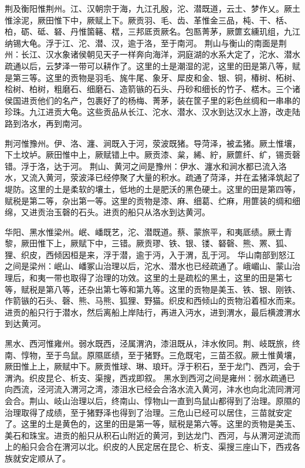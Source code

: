 \documentclass[a4paper,12pt,UTF8,twoside]{ctexbook}
\begin{document}
荆及衡阳惟荆州。江、汉朝宗于海，九江孔殷，沱、潜既道，云土、梦作乂。厥土惟涂泥，厥田惟下中，厥赋上下。厥贡羽、毛、齿、革惟金三品，杶、干、栝、柏，砺、砥、砮、丹惟箘簵、楛，三邦厎贡厥名。包匦菁茅，厥篚玄纁玑组，九江纳锡大龟。浮于江、沱、潜、汉，逾于洛，至于南河。
荆山与衡山的南面是荆州：长江、汉水象诸侯朝见天子一样奔向海洋，洞庭湖的水系大定了，沱水、潜水疏通以后，云梦泽一带可以耕作了。这里的土是潮湿的泥，这里的田是第八等，赋是第三等。这里的贡物是羽毛、旄牛尾、象牙、犀皮和金、银、铜，椿树、柘树、桧树、柏树，粗磨石、细磨石、造箭镞的石头、丹砂和细长的竹子、楛木。三个诸侯国进贡他们的名产，包裹好了的杨梅、菁茅，装在筐子里的彩色丝绸和一串串的珍珠。九江进贡大龟。这些贡品从长江、沱水、潜水、汉水到达汉水上游，改走陆路到洛水，再到南河。

荆河惟豫州。伊、洛、瀍、涧既入于河，荥波既猪。导菏泽，被孟猪。厥土惟壤，下土坟垆。厥田惟中上，厥赋错上中。厥贡漆、枲，絺、紵，厥篚纤、纩，锡贡磬错。浮于洛，达于河。
荆山、黄河之间是豫州：伊水、瀍水和涧水都已流入洛水，又流入黄河，荥波泽已经停聚了大量的积水。疏通了菏泽，并在孟猪泽筑起了堤防。这里的土是柔软的壤土，低地的土是肥沃的黑色硬土。这里的田是第四等，赋税是第二等，杂出第一等。这里的贡物是漆、麻、细葛、纻麻，用篚装的绸和细绵，又进贡治玉磬的石头。进贡的船只从洛水到达黄河。

华阳、黑水惟梁州。岷、嶓既艺，沱、潜既道。蔡、蒙旅平，和夷厎绩。厥土青黎，厥田惟下上，厥赋下中，三错。厥贡璆、铁、银、镂、砮磬、熊、罴、狐、狸、织皮，西倾因桓是来，浮于潜，逾于沔，入于渭，乱于河。
华山南部到怒江之间是梁州：岷山、嶓冢山治理以后，沱水、潜水也已经疏通了。峨嵋山、蒙山治理后，和夷一带也取得了治理的功效。这里的土是疏松的黑土，这里的田是第七等，赋税是第八等，还杂出第七等和第九等。这里的贡物是美玉、铁、银、刚铁、作箭镞的石头、磬、熊、马熊、狐狸、野猫。织皮和西倾山的贡物沿着桓水而来。进贡的船只行于潜水，然后离船上岸陆行，再进入沔水，进到渭水，最后横渡渭水到达黄河。

黑水、西河惟雍州。弱水既西，泾属渭汭，漆沮既从，沣水攸同。荆、岐既旅，终南、惇物，至于鸟鼠。原隰厎绩，至于猪野。三危既宅，三苗丕叙。厥土惟黄壤，厥田惟上上，厥赋中下。厥贡惟球、琳、琅玕。浮于积石，至于龙门、西河，会于渭汭。织皮昆仑、析支、渠搜，西戎即叙。
黑水到西河之间是雍州：弱水疏通已向西流，泾河流入渭河之湾，漆沮水已经会合洛水流入黄河，沣水也向北流同渭河会合。荆山、岐山治理以后，终南山、惇物山一直到鸟鼠山都得到了治理。原隰的治理取得了成绩，至于猪野泽也得到了治理。三危山已经可以居住，三苗就安定了。这里的土是黄色的，这里的田是第一等，赋税是第六等。这里的贡物是美玉、美石和珠宝。进贡的船只从积石山附近的黄河，到达龙门、西河，与从渭河逆流而上的船只会合在渭河以北。织皮的人民定居在昆仑、析支、渠搜三座山下，西戎各族就安定顺从了。
\end{document}
